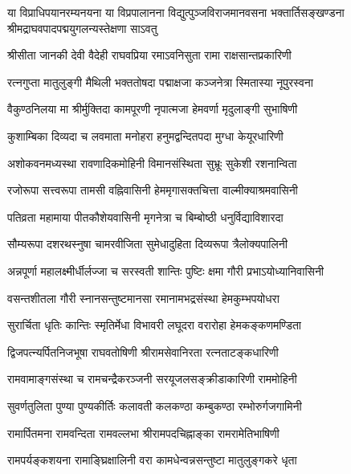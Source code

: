 
{या विप्राधिपयानरम्यनयना या विप्रपालानना}
{विद्युत्पुञ्जविराजमानवसना भक्तार्तिसङ्खण्डना}
{श्रीमद्राघवपादपद्मयुगलन्यस्तेक्षणा साऽवतु}

\twolineshloka
{श्रीसीता जानकी देवी वैदेही राघवप्रिया}
{रमाऽवनिसुता रामा राक्षसान्तप्रकारिणी}

\twolineshloka
{रत्नगुप्ता मातुलुङ्गी मैथिली भक्ततोषदा}
{पद्माक्षजा कञ्जनेत्रा स्मितास्या नूपुरस्वना}

\twolineshloka
{वैकुण्ठनिलया मा श्रीर्मुक्तिदा कामपूरणी}
{नृपात्मजा हेमवर्णा मृदुलाङ्गी सुभाषिणी}

\twolineshloka
{कुशाम्बिका दिव्यदा च लवमाता मनोहरा}
{हनुमद्वन्दितपदा मुग्धा केयूरधारिणी}

\twolineshloka
{अशोकवनमध्यस्था रावणादिकमोहिनी}
{विमानसंस्थिता सुभ्रूः सुकेशी रशनान्विता}

\twolineshloka
{रजोरूपा सत्त्वरूपा तामसी वह्निवासिनी}
{हेममृगासक्तचित्ता वाल्मीक्याश्रमवासिनी}

\twolineshloka
{पतिव्रता महामाया पीतकौशेयवासिनी}
{मृगनेत्रा च बिम्बोष्ठी धनुर्विद्याविशारदा}

\twolineshloka
{सौम्यरूपा दशरथस्नुषा चामरवीजिता}
{सुमेधादुहिता दिव्यरूपा त्रैलोक्यपालिनी}

\twolineshloka
{अन्नपूर्णा महालक्ष्मीर्धीर्लज्जा च सरस्वती}
{शान्तिः पुष्टिः क्षमा गौरी प्रभाऽयोध्यानिवासिनी}

\twolineshloka
{वसन्तशीतला गौरी स्नानसन्तुष्टमानसा}
{रमानामभद्रसंस्था हेमकुम्भपयोधरा}

\twolineshloka
{सुरार्चिता धृतिः कान्तिः स्मृतिर्मेधा विभावरी}
{लघूदरा वरारोहा हेमकङ्कणमण्डिता}

\twolineshloka
{द्विजपत्न्यर्पितनिजभूषा राघवतोषिणी}
{श्रीरामसेवानिरता रत्नताटङ्कधारिणी}

\twolineshloka
{रामवामाङ्गसंस्था च रामचन्द्रैकरञ्जनी}
{सरयूजलसङ्क्रीडाकारिणी राममोहिनी}

\twolineshloka
{सुवर्णतुलिता पुण्या पुण्यकीर्तिः कलावती}
{कलकण्ठा कम्बुकण्ठा रम्भोरुर्गजगामिनी}

\twolineshloka
{रामार्पितमना रामवन्दिता रामवल्लभा}
{श्रीरामपदचिह्नाङ्का रामरामेतिभाषिणी}

\twolineshloka
{रामपर्यङ्कशयना रामाङ्घ्रिक्षालिनी वरा}
{कामधेन्वन्नसन्तुष्टा मातुलुङ्गकरे धृता}

